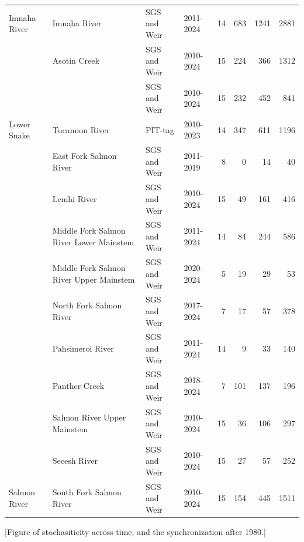 \documentclass[12pt,a4paper]{article}
\begin{document}
\begin{table}
\begin{tabular}[t]{llllrrrr}
Imnaha River & Imnaha River & SGS and Weir & 2011-2024 & 14 & 683 & 1241 & 2881\\

 & Asotin Creek & SGS and Weir & 2010-2024 & 15 & 224 & 366 & 1312\\

 &  & SGS and Weir & 2010-2024 & 15 & 232 & 452 & 841\\

\multirow[t]{-3}{*}[1\dimexpr\aboverulesep+\belowrulesep+\cmidrulewidth]{\raggedright\arraybackslash Lower Snake} & \multirow[t]{-2}{*}{\raggedright\arraybackslash Tucannon River} & PIT-tag & 2010-2023 & 14 & 347 & 611 & 1196\\

 & East Fork Salmon River & SGS and Weir & 2011-2019 & 8 & 0 & 14 & 40\\

 & Lemhi River & SGS and Weir & 2010-2024 & 15 & 49 & 161 & 416\\

 & Middle Fork Salmon River Lower Mainstem & SGS and Weir & 2011-2024 & 14 & 84 & 244 & 586\\

 & Middle Fork Salmon River Upper Mainstem & SGS and Weir & 2020-2024 & 5 & 19 & 29 & 53\\

 & North Fork Salmon River & SGS and Weir & 2017-2024 & 7 & 17 & 57 & 378\\

 & Pahsimeroi River & SGS and Weir & 2011-2024 & 14 & 9 & 33 & 140\\

 & Panther Creek & SGS and Weir & 2018-2024 & 7 & 101 & 137 & 196\\

 & Salmon River Upper Mainstem & SGS and Weir & 2010-2024 & 15 & 36 & 106 & 297\\

 & Secesh River & SGS and Weir & 2010-2024 & 15 & 27 & 57 & 252\\

\multirow[t]{-10}{*}[9\dimexpr\aboverulesep+\belowrulesep+\cmidrulewidth]{\raggedright\arraybackslash Salmon River} & South Fork Salmon River & SGS and Weir & 2010-2024 & 15 & 154 & 445 & 1511\\
\bottomrule
\end{tabular}
\end{table}

{[}Figure of stochasiticity across time, and the synchronization after 1980.{]}
\end{document}
